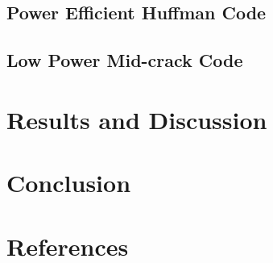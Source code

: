 \documentclass[preprint]{elsarticle} %
\begin{document}
\subsection{Power Efficient Huffman Code}
\subsection{Low Power Mid-crack Code}



\section{Results and Discussion}
\label{sec4}


\section{Conclusion}
\label{sec5}
        
\section*{References}


\end{document}
